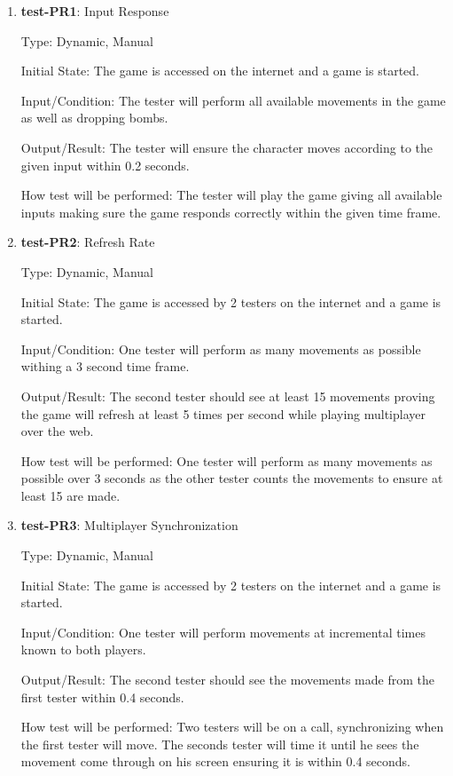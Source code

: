 \documentclass[12pt, titlepage]{article}
\begin{document}
\begin{enumerate}

\item{\textbf{test-PR1}: Input Response\\}

Type: Dynamic, Manual
					
Initial State: The game is accessed on the internet and a game is started.
					
Input/Condition: The tester will perform all available movements in the game as well as dropping bombs.
					
Output/Result: The tester will ensure the character moves according to the given input within 0.2 seconds. 
					
How test will be performed: The tester will play the game giving all available inputs making sure the game responds correctly within the given time frame. 

\item{\textbf{test-PR2}: Refresh Rate\\}

Type: Dynamic, Manual
					
Initial State: The game is accessed by 2 testers on the internet and a game is started.
					
Input/Condition: One tester will perform as many movements as possible withing a 3 second time frame.
					
Output/Result: The second tester should see at least 15 movements proving the game will refresh at least 5 times per second while playing multiplayer over the web. 
					
How test will be performed: One tester will perform as many movements as possible over 3 seconds as the other tester counts the movements to ensure at least 15 are made.

\item{\textbf{test-PR3}: Multiplayer Synchronization\\}

Type: Dynamic, Manual
					
Initial State: The game is accessed by 2 testers on the internet and a game is started.
					
Input/Condition: One tester will perform movements at incremental times known to both players.
					
Output/Result: The second tester should see the movements made from the first tester within 0.4 seconds. 
					
How test will be performed: Two testers will be on a call, synchronizing when the first tester will move. The seconds tester will time it until he sees the movement come through on his screen ensuring it is within 0.4 seconds.

\end{enumerate}
\end{document}
